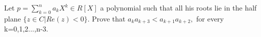 Let $ p=\sum\limits_{k=0}^n a_kX^k\in R[X] $ a polynomial such that all his roots  lie in the half plane $ \{z\in C| Re(z)<0 \}. $ Prove that $ a_ka_{k+3}<a_{k+1}a_{k+2}, $ for every k=0,1,2...,n-3.
